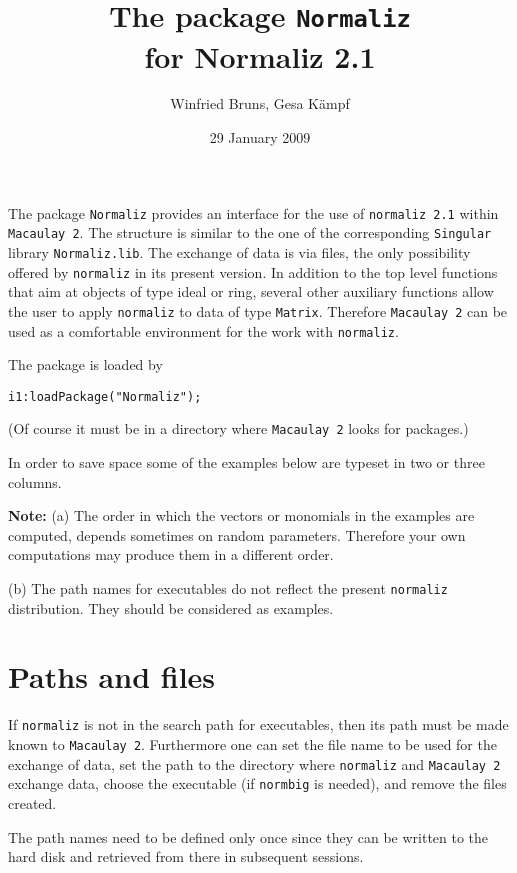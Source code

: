 \documentclass[11pt]{amsart}
\begin{document}
\author{Winfried Bruns, Gesa K\"ampf}
\title[The package {\tt Normaliz}
for Normaliz 2.1]{The package {\tt Normaliz}\\
for Normaliz 2.1}
\date{29 January 2009}
\maketitle

The package {\tt Normaliz} provides an interface for the use of
{\tt normaliz 2.1} within {\tt Macaulay 2}. The structure is similar to 
the one of the corresponding {\tt Singular} library {\tt Normaliz.lib}. 
The exchange of data is
via files, the only possibility offered by {\tt normaliz} in its
present version. In addition to the top level functions that aim at
objects of type ideal or ring, several other auxiliary functions
allow the user to apply {\tt normaliz} to data of type {\tt Matrix}.
Therefore {\tt Macaulay 2} can be used as a comfortable environment
for the work with {\tt normaliz}.

The package is loaded by

\begin{alltt}
i1 : loadPackage("Normaliz");
\end{alltt}
(Of course it must be in a directory where {\tt Macaulay 2} looks for
packages.) 

In order to save space some of the examples below are typeset
in two or three columns.

\textbf{Note:} (a) The order in which the vectors or monomials in
the examples are computed, depends sometimes on random parameters.
Therefore  your own computations may produce them in a different
order.

(b) The path names for executables do not reflect the present
\verb+normaliz+ distribution. They should be considered as examples.

\section{Paths and files}

If {\tt normaliz} is not in the search path for executables, then
its path must be made known to {\tt Macaulay 2}. Furthermore one can
set the file name to be used for the exchange of data, set the path
to the directory where {\tt normaliz} and {\tt Macaulay 2} exchange
data, choose the executable (if {\tt normbig} is needed), and remove
the files created.

The path names need to be defined only once since they can be
written to the hard disk and retrieved from there in subsequent
sessions.
\end{document}
